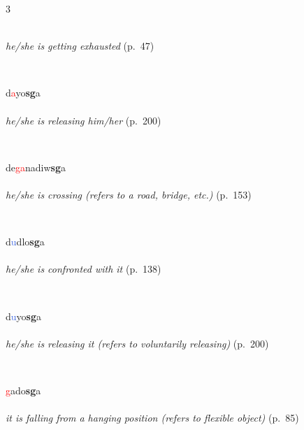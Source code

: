 \documentclass[oneside,openany]{book}%
\begin{document}
\begin{multicols}{3}
\begin{minipage}[t]{\linewidth}
\\
\noindent \textit{he/she is getting exhausted} (p.~47)
\end{minipage}\\[1em]%
\begin{minipage}[t]{\linewidth}
\raggedright\noindent d\textcolor{Red}{a}yo\textbf{sg}a\\
\\
\noindent \textit{he/she is releasing him/her} (p.~200)
\end{minipage}\\[1em]%
\begin{minipage}[t]{\linewidth}
\raggedright\noindent de\textcolor{Red}{ga}nadiw\textbf{sg}a\\
\\
\noindent \textit{he/she is crossing (refers to a road, bridge, etc.)} (p.~153)
\end{minipage}\\[1em]%
\begin{minipage}[t]{\linewidth}
\raggedright\noindent d\textcolor{RoyalBlue}{u}dlo\textbf{sg}a\\
\\
\noindent \textit{he/she is confronted with it} (p.~138)
\end{minipage}\\[1em]%
\begin{minipage}[t]{\linewidth}
\raggedright\noindent d\textcolor{RoyalBlue}{u}yo\textbf{sg}a\\
\\
\noindent \textit{he/she is releasing it (refers to voluntarily releasing)} (p.~200)
\end{minipage}\\[1em]%
\begin{minipage}[t]{\linewidth}
\raggedright\noindent \textcolor{Red}{g}ado\textbf{sg}a\\
\\
\noindent \textit{it is falling from a hanging position (refers to flexible object)} (p.~85)

\end{minipage}
\end{multicols}
\end{document}
